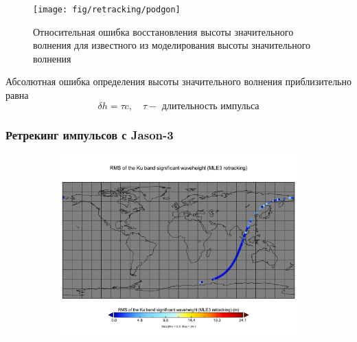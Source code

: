 \documentclass[10pt,pdf,hyperref={unicode}, dvipsnames]{beamer}
\begin{document}
\begin{frame}[t]{}
    \begin{figure}[h]
        \centering
        \texttt{[image: fig/retracking/podgon]}
        \caption{Относительная ошибка восстановления высоты значительного
        волнения для известного из моделирования высоты значительного волнения}
    \end{figure}
    Абсолютная ошибка определения высоты значительного волнения приблизительно
    равна
    \begin{equation}
        \delta h = \tau c, \quad \tau - \text{ длительность импульса}
    \end{equation}
\end{frame}

\begin{frame}
\frametitle{Ретрекинг импульсов с Jason-3}
\vskip -3pt
\begin{figure}[ht]
    \centering
    \begin{subfigure}{\linewidth}
        \centering
        \includegraphics[width=\linewidth]{img/swh_rms_ku_mle3}
    \end{subfigure}
\end{figure}
\end{frame}
\end{document}

